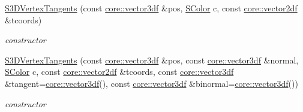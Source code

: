 \begin{DoxyCompactItemize}
\mbox{\label{structirr_1_1video_1_1S3DVertexTangents_a55532d7609227010fd31b3b9fbb4c03a}} 
\hyperlink{structirr_1_1video_1_1S3DVertexTangents_a55532d7609227010fd31b3b9fbb4c03a}{S3\+D\+Vertex\+Tangents} (const \hyperlink{namespaceirr_1_1core_ae6e2b2a6c552833ebbd5b7463d03586b}{core\+::vector3df} \&pos, \hyperlink{classirr_1_1video_1_1SColor}{S\+Color} c, const \hyperlink{namespaceirr_1_1core_a116f90bd31515724b6235014ee2b74d5}{core\+::vector2df} \&tcoords)
\begin{DoxyCompactList}\small\item\em constructor \end{DoxyCompactList}\item 
\mbox{\label{structirr_1_1video_1_1S3DVertexTangents_a08be9afd37c99f7e95e762340f395eaa}} 
\hyperlink{structirr_1_1video_1_1S3DVertexTangents_a08be9afd37c99f7e95e762340f395eaa}{S3\+D\+Vertex\+Tangents} (const \hyperlink{namespaceirr_1_1core_ae6e2b2a6c552833ebbd5b7463d03586b}{core\+::vector3df} \&pos, const \hyperlink{namespaceirr_1_1core_ae6e2b2a6c552833ebbd5b7463d03586b}{core\+::vector3df} \&normal, \hyperlink{classirr_1_1video_1_1SColor}{S\+Color} c, const \hyperlink{namespaceirr_1_1core_a116f90bd31515724b6235014ee2b74d5}{core\+::vector2df} \&tcoords, const \hyperlink{namespaceirr_1_1core_ae6e2b2a6c552833ebbd5b7463d03586b}{core\+::vector3df} \&tangent=\hyperlink{namespaceirr_1_1core_ae6e2b2a6c552833ebbd5b7463d03586b}{core\+::vector3df}(), const \hyperlink{namespaceirr_1_1core_ae6e2b2a6c552833ebbd5b7463d03586b}{core\+::vector3df} \&binormal=\hyperlink{namespaceirr_1_1core_ae6e2b2a6c552833ebbd5b7463d03586b}{core\+::vector3df}())
\begin{DoxyCompactList}\small\item\em constructor \end{DoxyCompactList}\end{DoxyCompactItemize}
